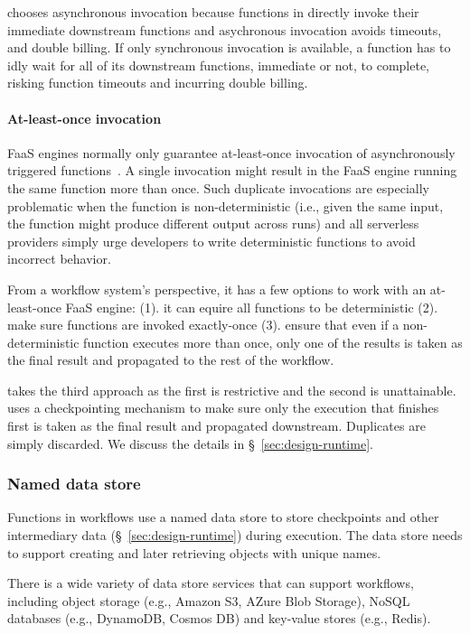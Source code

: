 \name{} chooses asynchronous invocation because functions in \name{} directly invoke
their immediate downstream functions and asychronous invocation avoids
timeouts, and double billing. If only synchronous invocation is available, a
function has to idly wait for all of its downstream functions, immediate or
not, to complete, risking function timeouts and incurring double billing.

\paragraph{At-least-once invocation}

FaaS engines normally only guarantee at-least-once invocation of
asynchronously triggered
functions~\cite{google-cloud-functions-exec-guarantee,
aws-lambda-async-invoke, azure-functions-exec-guarantee}. A single invocation
might result in the FaaS engine running the same function more than once. Such
duplicate invocations are especially problematic when the function is
non-deterministic (i.e., given the same input, the function might produce
different output across runs) and all serverless providers simply urge
developers to write deterministic functions to avoid incorrect behavior.

From a workflow system's perspective, it has a few options to work with an
at-least-once FaaS engine: (1). it can equire all functions to be
deterministic (2). make sure functions are invoked exactly-once (3). ensure
that even if a non-deterministic function executes more than once, only one of
the results is taken as the final result and propagated to the rest of the
workflow.

\name{} takes the third approach as the first is restrictive and the second is
unattainable. \name{} uses a checkpointing mechanism to make sure only the
execution that finishes first is taken as the final result and propagated
downstream. Duplicates are simply discarded. We discuss the details in
\S~\ref{sec:design-runtime}.

\subsubsection{Named data store}

Functions in \name{} workflows use a named data store to store checkpoints and
other intermediary data (\S~\ref{sec:design-runtime}) during execution. The
data store needs to support creating and later retrieving objects with unique
names.

There is a wide variety of data store services that can support \name{}
workflows, including object storage (e.g., Amazon S3, AZure Blob Storage),
NoSQL databases (e.g., DynamoDB, Cosmos DB) and key-value stores (e.g.,
Redis).

